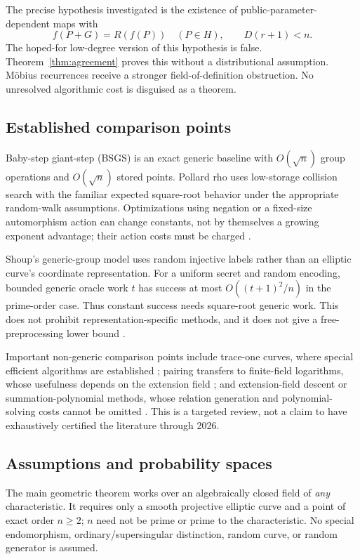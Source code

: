 \documentclass[11pt,letterpaper]{article}
\theoremstyle{definition}
\theoremstyle{remark}
\begin{document}
The precise hypothesis investigated is the existence of public-parameter-dependent maps with
\begin{equation}\label{eq:hyp}
f(P+G)=R(f(P))\quad(P\in H),\qquad D(r+1)<n.
\end{equation}
The hoped-for low-degree version of this hypothesis is false. Theorem~\ref{thm:agreement} proves this without a distributional assumption. M\"obius recurrences receive a stronger field-of-definition obstruction. No unresolved algorithmic cost is disguised as a theorem.

\subsection{Established comparison points}

Baby-step giant-step (BSGS) is an exact generic baseline with $O(\sqrt n)$ group operations and $O(\sqrt n)$ stored points. Pollard rho uses low-storage collision search with the familiar expected square-root behavior under the appropriate random-walk assumptions. Optimizations using negation or a fixed-size automorphism action can change constants, not by themselves a growing exponent advantage; their action costs must be charged \cite{gal13,gal14}.

Shoup's generic-group model uses random injective labels rather than an elliptic curve's coordinate representation. For a uniform secret and random encoding, bounded generic oracle work $t$ has success at most $O((t+1)^2/n)$ in the prime-order case. Thus constant success needs square-root generic work. This does not prohibit representation-specific methods, and it does not give a free-preprocessing lower bound \cite{shoup}.

Important non-generic comparison points include trace-one curves, where special efficient algorithms are established \cite{smart}; pairing transfers to finite-field logarithms, whose usefulness depends on the extension field \cite{mov}; and extension-field descent or summation-polynomial methods, whose relation generation and polynomial-solving costs cannot be omitted \cite{gal15,semaev,survey}. This is a targeted review, not a claim to have exhaustively certified the literature through 2026.

\subsection{Assumptions and probability spaces}

The main geometric theorem works over an algebraically closed field of \emph{any} characteristic. It requires only a smooth projective elliptic curve and a point of exact order $n\ge2$; $n$ need not be prime or prime to the characteristic. No special endomorphism, ordinary/supersingular distinction, random curve, or random generator is assumed.
\end{document}
